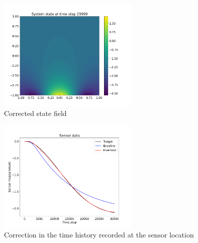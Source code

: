 \documentclass{article}
\begin{document}
\begin{figure}[H]
\centering
\includegraphics[width=0.6\textwidth]{corrfield.png}
\caption{Corrected state field}
\label{res}
\end{figure}

\begin{figure}[H]
\centering
\includegraphics[width=0.6\textwidth]{final_comparison.png}
\caption{Correction in the time history recorded at the sensor location}
\label{res}
\end{figure}
%
%
\end{document}
